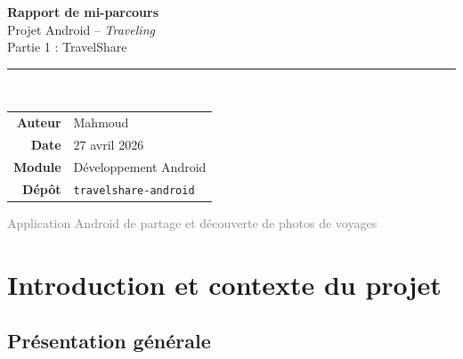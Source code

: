 \documentclass[12pt, a4paper]{report}
\begin{document}
\begin{titlepage}
  \centering
  \vspace*{1cm}


  \vspace{1.5cm}
  {\Huge \textbf{Rapport de mi-parcours}}\\[0.4cm]
  {\Large \textcolor{primary}{Projet Android -- \textit{Traveling}}}\\[0.3cm]
  {\large Partie 1 : TravelShare}

  \vspace{1cm}
  \rule{10cm}{0.5pt}\\[1cm]

  \begin{tabular}{rl}
    \textbf{Auteur}       & Mahmoud \\[0.3cm]
    \textbf{Date}         & 27 avril 2026 \\[0.3cm]
    \textbf{Module}       & Développement Android \\[0.3cm]
    \textbf{Dépôt}        & \texttt{travelshare-android} \\
  \end{tabular}

  \vfill
  \textcolor{gray}{\small Application Android de partage et découverte de photos de voyages}
\end{titlepage}

\tableofcontents
\newpage

\chapter{Introduction et contexte du projet}

\section{Présentation générale}
\end{document}
